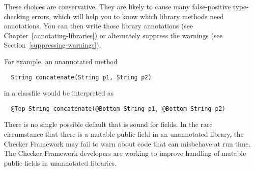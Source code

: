 These choices are conservative.  They are likely to cause many
false-positive type-checking errors, which will help you to know which
library methods need annotations.  You can then write those library
annotations (see Chapter~\ref{annotating-libraries}) or alternately
suppress the warnings (see Section~\ref{suppressing-warnings}).

For example, an unannotated method

\begin{Verbatim}
  String concatenate(String p1, String p2)
\end{Verbatim}

\noindent
in a classfile would be interpreted as

\begin{Verbatim}
  @Top String concatenate(@Bottom String p1, @Bottom String p2)
\end{Verbatim}

There is no single possible default that is sound for fields.  In the rare
circumstance that there is a mutable public field in an unannotated
library, the Checker Framework may fail to warn about code that can
misbehave at run time.  The Checker Framework developers are working to
improve handling of mutable public fields in unannotated libraries.




